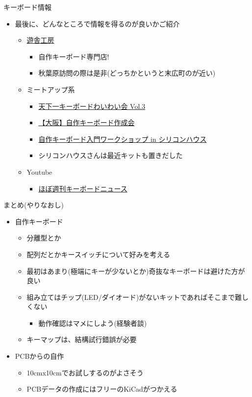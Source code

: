 \documentclass[cjk,dvipdfmx,10pt,compress,fragile%
hyperref={bookmarks=true,bookmarksnumbered=true,bookmarksopen=false,%
colorlinks=false,%
pdftitle={第 134 回 関西 Debian 勉強会},%
pdfauthor={小林},%
pdfsubject={資料},%
}]{beamer}
\begin{document}
\begin{frame}[fragile,t]{キーボード情報}
 \begin{itemize}
  \item 最後に、どんなところで情報を得るのが良いかご紹介
	\begin{itemize}
	 \item \href{https://yushakobo.jp/}{遊舎工房}
	       \begin{itemize}
		\item 自作キーボード専門店!
		\item 秋葉原訪問の際は是非(どっちかというと末広町のが近い)
	       \end{itemize}
	 \item ミートアップ系
	       \begin{itemize}
		\item \href{https://tenkey.connpass.com/event/150626/}{天下一キーボードわいわい会 Vol.3}
		\item \href{https://selfmade-keyboad-fan-club.connpass.com/event/152614/}{【大阪】自作キーボード作成会}
		\item \href{https://connpass.com/event/132509/}{自作キーボード入門ワークショップ in シリコンハウス}
		\item シリコンハウスさんは最近キットも置きだした
	       \end{itemize}
	 \item Youtube
	       \begin{itemize}
		\item \href{https://www.youtube.com/channel/UCyU1PAGvw_suAyI4wljHmag}{ほぼ週刊キーボードニュース}
	       \end{itemize}
	\end{itemize}
 \end{itemize}
\end{frame}

\begin{frame}[fragile,t]{まとめ(やりなおし)}
 \begin{itemize}
  \item 自作キーボード
	\begin{itemize}
	 \item 分離型とか
	 \item 配列だとかキースイッチについて好みを考える
	 \item 最初はあまり(極端にキーが少ないとか)奇抜なキーボードは避けた方が良い
	 \item 組み立てはチップ(LED/ダイオード)がないキットであればそこまで難しくない
	       \begin{itemize}
		\item 動作確認はマメにしよう(経験者談)
	       \end{itemize}
	 \item キーマップは、結構試行錯誤が必要
	\end{itemize}
  \item PCBからの自作
	\begin{itemize}
	 \item 10cmx10cmでお試しするのがよさそう
	 \item PCBデータの作成にはフリーのKiCadがつかえる
	\end{itemize}
 \end{itemize}
\end{frame}

\end{document}
